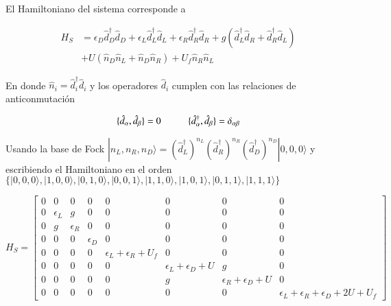 
El Hamiltoniano del sistema corresponde a 

\begin{align*}
    H_{S} & = \epsilon_{D}\hat{d}^{\dagger}_{D}\hat{d}_{D} + \epsilon_{L} \hat{d}^{\dagger}_{L}\hat{d}_{L} + \epsilon_{R}\hat{d}^{\dagger}_{R}\hat{d}_{R} + g(\hat{d}^{\dagger}_{L}\hat{d}_{R} + \hat{d}^{\dagger}_{R}\hat{d}_{L} ) \\
          & + U(\hat{n}_{D}\hat{n}_{L} + \hat{n}_{D}\hat{n}_{R} )  + U_{f}\hat{n}_{R}\hat{n}_{L} 
\end{align*}

En donde $\hat{n}_{i} = \hat{d}^{\dagger}_{i} \hat{d}_{i}$ y los operadores $\hat{d}_{i}$ cumplen con las relaciones de anticonmutación

\begin{equation*}
    \{\hat{d}_{\alpha},\hat{d}_{\beta} \} = 0  \hspace{10mm} \{\hat{d}^{\dagger}_{\alpha}, \hat{d}_{\beta} \} = \delta_{\alpha \beta}
\end{equation*}

Usando la base de Fock $|n_{L},n_{R},n_{D} \rangle = (\hat{d}^{\dagger}_{L})^{n_{L}}(\hat{d}^{\dagger}_{R})^{n_{R}}(\hat{d}^{\dagger}_{D})^{n_{D}}|0,0,0\rangle$ y escribiendo el Hamiltoniano en el orden 
$\{|0,0,0\rangle, |1,0,0\rangle, |0,1,0\rangle, |0,0,1\rangle, |1,1,0\rangle, |1,0,1\rangle, |0,1,1\rangle, |1,1,1\rangle\}$ 

\begin{equation*}
    H_{S} = 
    \begin{bmatrix}
        0 & 0 & 0 & 0 & 0 & 0 & 0 & 0 \\
        0 & \epsilon_{L} & g & 0 & 0 & 0 & 0 & 0 \\
        0 & g & \epsilon_{R} & 0 & 0 & 0 & 0 & 0 \\
        0 & 0 & 0 & \epsilon_{D} & 0 & 0 & 0 & 0 \\
        0 & 0 & 0 & 0 & \epsilon_{L} + \epsilon_{R}  + U_{f} & 0 & 0 & 0 \\
        0 & 0 & 0 & 0 & 0 & \epsilon_{L} + \epsilon_{D} + U & g & 0 \\
        0 & 0 & 0 & 0 & 0 & g & \epsilon_{R} + \epsilon_{D} + U & 0 \\
        0 & 0 & 0 & 0 & 0 & 0 & 0 & \epsilon_{L} + \epsilon_{R}  + \epsilon_{D} + 2U + U_{f} 
        \end{bmatrix}
\end{equation*}

